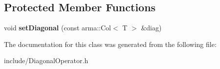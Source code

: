 \subsection*{Protected Member Functions}
\begin{DoxyCompactItemize}
\item 
void {\bfseries set\+Diagonal} (const arma\+::\+Col$<$ T $>$ \&diag)\hypertarget{classkl1p_1_1TDiagonalOperator_a71d5b6147b5b055ba82ee2c69e983d2d}{}\label{classkl1p_1_1TDiagonalOperator_a71d5b6147b5b055ba82ee2c69e983d2d}

\end{DoxyCompactItemize}


The documentation for this class was generated from the following file\+:\begin{DoxyCompactItemize}
\item 
include/Diagonal\+Operator.\+h\end{DoxyCompactItemize}
